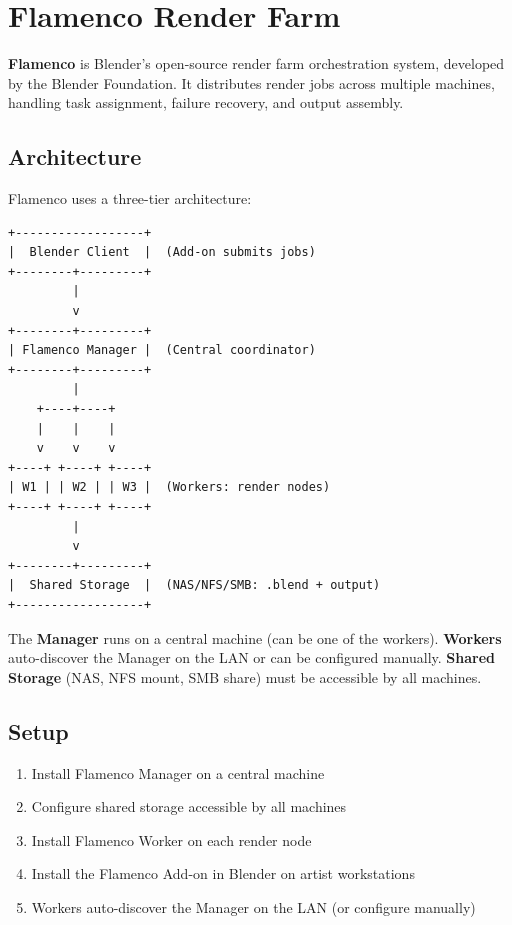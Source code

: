 \section{Flamenco Render Farm}
\label{sec:scripting-flamenco}

\textbf{Flamenco} is Blender's open-source render farm orchestration system, developed by the Blender Foundation. It distributes render jobs across multiple machines, handling task assignment, failure recovery, and output assembly.

\subsection{Architecture}

Flamenco uses a three-tier architecture:

\begin{codebox}
\begin{verbatim}
+------------------+
|  Blender Client  |  (Add-on submits jobs)
+--------+---------+
         |
         v
+--------+---------+
| Flamenco Manager |  (Central coordinator)
+--------+---------+
         |
    +----+----+
    |    |    |
    v    v    v
+----+ +----+ +----+
| W1 | | W2 | | W3 |  (Workers: render nodes)
+----+ +----+ +----+
         |
         v
+--------+---------+
|  Shared Storage  |  (NAS/NFS/SMB: .blend + output)
+------------------+
\end{verbatim}
\end{codebox}

The \textbf{Manager} runs on a central machine (can be one of the workers). \textbf{Workers} auto-discover the Manager on the LAN or can be configured manually. \textbf{Shared Storage} (NAS, NFS mount, SMB share) must be accessible by all machines.

\subsection{Setup}

\begin{enumerate}[leftmargin=2em]
  \item Install Flamenco Manager on a central machine
  \item Configure shared storage accessible by all machines
  \item Install Flamenco Worker on each render node
  \item Install the Flamenco Add-on in Blender on artist workstations
  \item Workers auto-discover the Manager on the LAN (or configure manually)
\end{enumerate}

